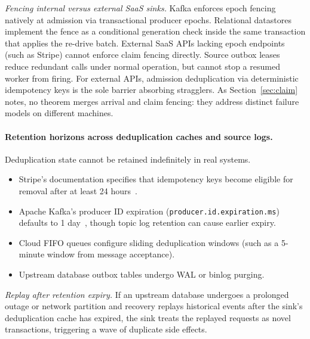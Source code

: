 \documentclass[sigplan,10pt]{acmart}
\theoremstyle{plain}
\theoremstyle{definition}
\let\origtexttt\texttt
\renewcommand{\texttt}[1]{{\origtexttt{\def\_{\textunderscore\allowbreak}#1}}}
\begin{document}
\emph{Fencing internal versus external SaaS sinks.}
Kafka enforces epoch fencing natively at admission via transactional producer
epochs. Relational datastores implement the fence as a conditional generation
check inside the same transaction that applies the re-drive batch. External
SaaS APIs lacking epoch endpoints (such as Stripe) cannot enforce
claim fencing directly. Source outbox leases reduce redundant calls under normal
operation, but cannot stop a resumed worker from firing. For external APIs,
admission deduplication via deterministic idempotency keys is the sole barrier
absorbing stragglers. As Section~\ref{sec:claim} notes, no theorem merges
arrival and claim fencing: they address distinct failure models on different
machines.

\paragraph{Retention horizons across deduplication caches and source logs.}
Deduplication state cannot be retained indefinitely in real systems.
\begin{itemize}
\item Stripe's documentation specifies that idempotency keys become
  eligible for removal after at least 24 hours~\cite{stripe}.
\item Apache Kafka's producer ID expiration
  (\texttt{producer.\allowbreak id.\allowbreak expiration.ms}) defaults to 1 day~\cite{kafka-exp},
  though topic log retention can cause earlier expiry.
\item Cloud FIFO queues configure sliding deduplication windows (such as
  a 5-minute window from message acceptance).
\item Upstream database outbox tables undergo WAL or binlog purging.
\end{itemize}

\emph{Replay after retention expiry.}
If an upstream database undergoes a prolonged outage or network partition
and recovery replays historical events after the sink's deduplication cache
has expired, the sink treats the replayed requests as novel transactions,
triggering a wave of duplicate side effects.
\end{document}
